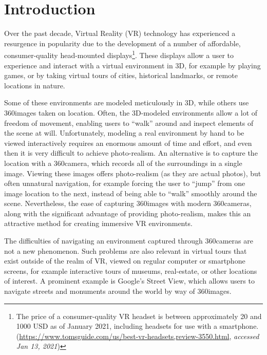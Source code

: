\chapter{Introduction}

Over the past decade, Virtual Reality (VR) technology has experienced a resurgence in popularity due to the development of a number of affordable, consumer-quality head-mounted displays\footnote{The price of a consumer-quality VR headset is between approximately 20 and 1000 USD as of January 2021, including headsets for use with a smartphone. \\(\url{https://www.tomsguide.com/us/best-vr-headsets,review-3550.html}, \emph{accessed Jan 13, 2021})}. These displays allow a user to experience and interact with a virtual environment in 3D, for example by playing games, or by taking virtual tours of cities, historical landmarks, or remote locations in nature.

Some of these environments are modeled meticulously in 3D, while others use 360\degree images taken on location. Often, the 3D-modeled environments allow a lot of freedom of movement, enabling users to ``walk'' around and inspect elements of the scene at will. Unfortunately, modeling a real environment by hand to be viewed interactively requires an enormous amount of time and effort, and even then it is very difficult to achieve photo-realism. An alternative is to capture the location with a 360\degree camera, which records all of the surroundings in a single image. Viewing these images offers photo-realism (as they are actual photos), but often unnatural navigation, for example forcing the user to ``jump'' from one image location to the next, instead of being able to ``walk'' smoothly around the scene. Nevertheless, the ease of capturing 360\degree images with modern 360\degree cameras, along with the significant advantage of providing photo-realism, makes this an attractive method for creating immersive VR environments.

The difficulties of navigating an environment captured through 360\degree cameras are not a new phenomenon. Such problems are also relevant in virtual tours that exist outside of the realm of VR, viewed on regular computer or smartphone screens, for example interactive tours of museums, real-estate, or other locations of interest. A prominent example is Google's Street View, which allows users to navigate streets and monuments around the world by way of 360\degree images.

